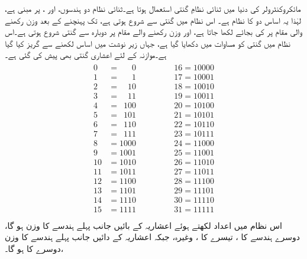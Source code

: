 	مائکروکنٹرولر کی دنیا میں ثنائی نظامِ گنتی استعمال ہوتا ہے۔ثنائی نظام  دو ہندسوں،    اور ،  پر مبنی ہے،  لہٰذا  یہ  اساس دو   کا نظام  ہے۔
	اس نظام میں گنتی  سے شروع ہوتی ہے،  تک پہنچنے کے بعد     وزن رکھنے  والی مقام پر  کی بجائے  لکھا جاتا ہے،  اور  وزن رکھنے والے مقام پر دوبارہ  سے   گنتی شروع ہوتی ہے۔اس نظام میں گنتی کو  مساوات  میں دکھایا گیا ہے، جہاں زیر نوشت میں اساس لکھنے سے گریز کیا گیا ہے۔موازنہ کے لئے اعشاری گنتی بھی پیش کی  گئی ہے۔
\begin{gather}
\begin{aligned}\label{مساوات_ثنائی_گنتی}
0&=\phantom{000}0 &\quad \quad \quad  &16=10000\\
1&=\phantom{000}1 &\quad \quad \quad  &17=10001\\
2&=\phantom{00}10 &\quad \quad \quad  &18=10010\\
3&=\phantom{00}11 &\quad \quad \quad  &19=10011\\
4&=\phantom{0}100 &\quad \quad \quad  &20=10100\\
5&=\phantom{0}101 &\quad \quad \quad  &21=10101\\
6&=\phantom{0}110 &\quad \quad \quad  &22=10110\\
7&=\phantom{0}111 &\quad \quad \quad  &23=10111\\
8&=1000 &\quad \quad \quad  &24=11000\\
9&=1001 &\quad \quad \quad  &25=11001\\
10&=1010 &\quad \quad \quad  &26=11010\\
11&=1011 &\quad \quad \quad  &27=11011\\
12&=1100 &\quad \quad \quad  &28=11100\\
13&=1101 &\quad \quad \quad  &29=11101\\
14&=1110 &\quad \quad \quad  &30=11110\\
15&=1111 &\quad \quad \quad  &31=11111\\
\end{aligned}
\end{gather}
	اس نظام میں اعداد لکھتے ہوئے اعشاریہ کے بائیں جانب پہلے ہندسے کا وزن    ہو گا،   دوسرے  ہندسے کا    ، تیسرے کا ،    وغیرہ،  جبکہ اعشاریہ کے دائیں جانب پہلے ہندسے کا وزن  ،دوسرے کا  ہو گا۔
	
